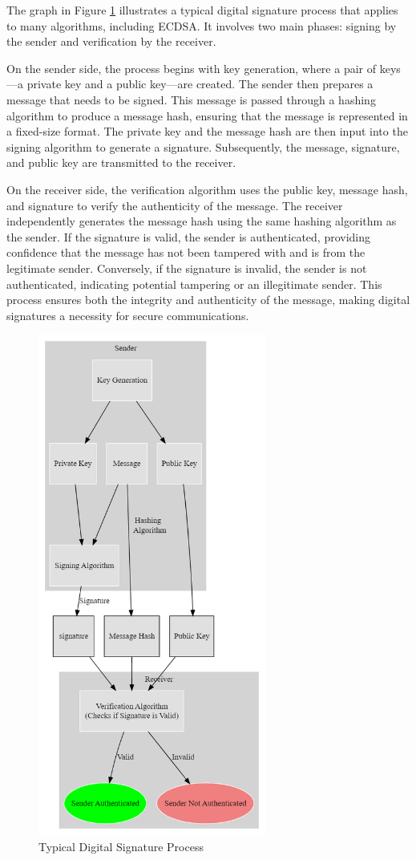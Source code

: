 The graph in Figure \ref{fig:ecdsa_graph} illustrates a typical digital signature process that applies to many algorithms, including ECDSA. It involves two main phases: signing by the sender and verification by the receiver. 

On the sender side, the process begins with key generation, where a pair of keys—a private key and a public key—are created. The sender then prepares a message that needs to be signed. This message is passed through a hashing algorithm to produce a message hash, ensuring that the message is represented in a fixed-size format. The private key and the message hash are then input into the signing algorithm to generate a signature. Subsequently, the message, signature, and public key are transmitted to the receiver.

On the receiver side, the verification algorithm uses the public key, message hash, and signature to verify the authenticity of the message. The receiver independently generates the message hash using the same hashing algorithm as the sender. If the signature is valid, the sender is authenticated, providing confidence that the message has not been tampered with and is from the legitimate sender. Conversely, if the signature is invalid, the sender is not authenticated, indicating potential tampering or an illegitimate sender. This process ensures both the integrity and authenticity of the message, making digital signatures a necessity for secure communications.

\begin{figure}[H]
    \centering
    \includegraphics[width=7.5cm]{img/TD ECDSA Graph.png}
    \caption{Typical Digital Signature Process}
    \label{fig:ecdsa_graph}
\end{figure}


